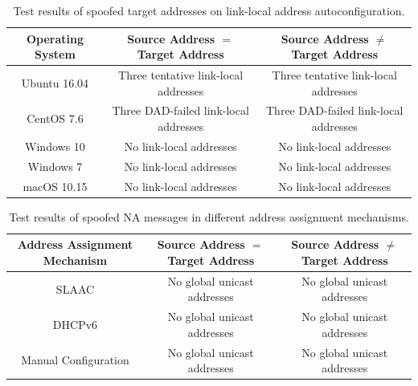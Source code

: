 \documentclass[journal]{IEEEtran}
\begin{document}
        \begin{table}
                \centering
                \caption{Test results of spoofed target addresses on link-local address autoconfiguration.}
                \begin{tabular}{|c||c|c|}
                    \hline
                    \textbf{Operating System} & 
                    \textbf{Source Address $=$ Target Address} & 
                    \textbf{Source Address $\neq$ Target Address} \\
                    \hline
                    \hline
                    Ubuntu 16.04 & Three tentative link-local addresses & Three tentative link-local addresses \\
                    \hline
                    CentOS 7.6 & Three DAD-failed link-local addresses & Three DAD-failed link-local addresses \\
                    \hline
                    Windows 10 & No link-local addresses & No link-local addresses \\
                    \hline
                    Windows 7 & No link-local addresses & No link-local addresses \\
                    \hline
                    macOS 10.15 & No link-local addresses & No link-local addresses \\
                    \hline
                \end{tabular}
                \label{tab:subnetLocal}
            \end{table}

            \begin{table}
                \centering
                \caption{Test results of spoofed NA messages in different address assignment mechanisms.}
                \begin{tabular}{|c||c|c|}
                    \hline
                    \textbf{Address Assignment Mechanism} & \textbf{Source Address $=$ Target Address} & \textbf{Source Address $\neq$ Target Address} \\
                    \hline
                    \hline
                    SLAAC & No global unicast addresses & No global unicast addresses \\
                    \hline
                    DHCPv6 & No global unicast addresses & No global unicast addresses \\
                    \hline
                    Manual Configuration & No global unicast addresses & No global unicast addresses \\
                    \hline
                \end{tabular}
                \label{tab:AddressAllocation}
            \end{table}
    
\end{document}
